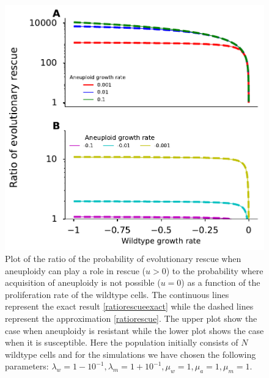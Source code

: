 \documentclass[12pt]{extarticle}
\begin{document}
\begin{figure}[!h]
 \vspace*{1\baselineskip}
\includegraphics[width=1\textwidth]{Figures/RatioEvolRescue.pdf}
\caption{Plot of the ratio of the probability of evolutionary rescue when aneuploidy can play a role in rescue ($u>0$) to the probability where acquisition of aneuploidy is not possible ($u=0$) as a function of the proliferation rate of the wildtype cells. The continuous lines represent the exact result \eqref{ratiorescueexact} while the dashed lines represent the approximation \eqref{ratiorescue}.  The upper plot show the case when aneuploidy is resistant while the lower plot shows the case when it is susceptible. Here the population initially consists of $N$ wildtype cells and for the simulations we have chosen the following parameters: $\lambda_w=1-10^{-1},\lambda_m=1+10^{-1},\mu_w=1,\mu_a=1,\mu_m=1$. }
\label{RatioEvolRescue}
\end{figure}
\end{document}
